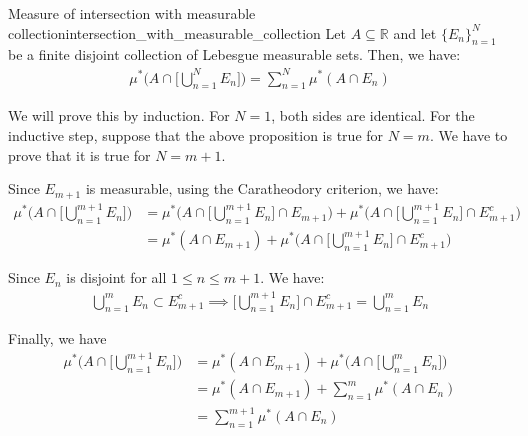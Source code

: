 \begin{proposition}{Measure of intersection with measurable collection}{intersection_with_measurable_collection}
    Let $A\subseteq \mathbb{R}$ and let $\{E_n\}_{n=1}^N$ be a finite disjoint collection of Lebesgue measurable sets. Then, we have:
    \begin{align*}
        \mu^*\Bigg( A \cap \Bigg[ \bigcup_{n=1}^N E_n \Bigg] \Bigg) = \sum_{n=1}^N \mu^*(A\cap E_n)
    \end{align*}
\end{proposition}

\begin{proof*}
    We will prove this by induction. For $N=1$, both sides are identical. For the inductive step, suppose that the above proposition is true for $N=m$. We have to prove that it is true for $N=m+1$.

    \noindent \newline Since $E_{m+1}$ is measurable, using the Caratheodory criterion, we have:
    \begin{align*}
        \mu^*\Bigg( A \cap \Bigg[ \bigcup_{n=1}^{m+1} E_n \Bigg] \Bigg) 
            &= \mu^*\Bigg( A \cap \Bigg[ \bigcup_{n=1}^{m+1} E_n \Bigg] \cap E_{m+1} \Bigg)
            + \mu^*\Bigg( A \cap \Bigg[ \bigcup_{n=1}^{m+1} E_n \Bigg] \cap E_{m+1}^c \Bigg) \\
            &= \mu^*(A\cap E_{m+1}) + \mu^*\Bigg( A \cap \Bigg[ \bigcup_{n=1}^{m+1} E_n \Bigg] \cap E_{m+1}^c \Bigg)
    \end{align*}

    \noindent \newline Since $E_{n}$ is disjoint for all $1 \le n \le m+1$. We have:
    \begin{align*}
        \bigcup_{n=1}^{m} E_n \subset E_{m+1}^c \implies \Bigg[ \bigcup_{n=1}^{m+1} E_n \Bigg] \cap E_{m+1}^c = \bigcup_{n=1}^m E_n
    \end{align*}

    \noindent \newline Finally, we have
    \begin{align*}
        \mu^*\Bigg( A \cap \Bigg[ \bigcup_{n=1}^{m+1} E_n \Bigg] \Bigg) 
            &= \mu^*(A\cap E_{m+1}) + \mu^*\Bigg( A \cap \Bigg[ \bigcup_{n=1}^{m} E_n \Bigg] \Bigg) \\
            &= \mu^*(A\cap E_{m+1}) + \sum_{n=1}^m \mu^*(A\cap E_n) \\
            &= \sum_{n=1}^{m+1} \mu^*(A\cap E_n)
    \end{align*}
\end{proof*}

